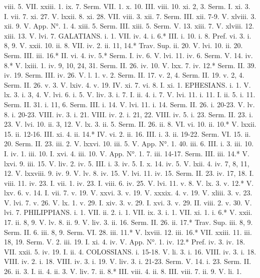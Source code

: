 viii. 5.	VII. xxiii. 1.
ix. 7.	Serm. VII. 1.
x. 10.	III. viii. 10.
xi. 2, 3.	Serm. I.
xi. 3.	I. vii. 7.
xi. 27.	V. lxxii. 8.
xi. 28.	VII. viii. 3.
xii. 7.	Serm. III.
xii. 7-9.	V. xlviii. 3.
xii. 9.	V. App. N°. 1. 4.
xiii. 5.	Serm. III.
xiii. 5.	Serm. V. 13.
xiii. 7.	V. xlviii. 12.
xiii. 13.	V. lvi. 7.
GALATIANS.
i. 1.	VII. iv. 4.
i. 6.*	III. i. 10.
i. 8.	Pref. vi. 3.
i. 8, 9.	V. xxii. 10.
ii. 8.	VII. iv. 2.
ii. 11, 14.*	Trav. Sup.
ii. 20.	V. lvi. 10.
ii. 20.	Serm. III.
iii. 16.*	II. vi. 4.
iv. 5.*	Serm. I.
iv. 6.	V. lvi. 11.
iv. 6.	Serm. V. 14.
iv. 8.*	V. lxiii. 1.
iv. 9, 10, 24, 31.	Serm. II. 26.
iv. 10.	V. lxx. 7.
iv. 12.*	Serm. II. 39.
iv. 19.	Serm. III.
iv. 26.	V. l. 1.
v. 2.	Serm. II. 17.
v. 2, 4.	Serm. II. 19.
v. 2, 4.	Serm. II. 26.
v. 3.	V. lxiv. 4.
v. 19.	IV. xi. 7.
vi. 8.	I. xi. 1.
EPHESIANS.
i. 1.	V. lx. 3.
i. 3, 4.	V. lvi. 6.
i. 5.	V. liv. 3.
i. 7.	I. ii. 4.
i. 7.	V. lvi. 11.
i. 11.	I. ii. 5.
i. 11.	Serm. II. 31.
i. 11, 6.	Serm. III.
i. 14.	V. lvi. 11.
i. 14.	Serm. II. 26.
i. 20-23.	V. lv. 8.
i. 20-23.	VIII. iv. 3.
i. 21.	VIII. iv. 2.
i. 21, 22.	VIII. iv. 5.
i. 23.	Serm. II. 23.
i. 23.	V. lvi. 10.
ii. 3, 12.	V. lx. 3.
ii. 5.	Serm. II. 26.
ii. 8.	VI. vi. 10.
ii. 10.*	V. lxxii. 15.
ii. 12-16.	III. xi. 4.
ii. 14.*	IV. vi. 2.
ii. 16.	III. i. 3.
ii. 19-22.	Serm. VI. 15.
ii. 20.	Serm. II. 23.
iii. 2.	V. lxxvi. 10.
iii. 5.	V. App. N°. 1. 40.
iii. 6.	III. i. 3.
iii. 10.	I. iv. 1.
iii. 10.	I. xvi. 4.
iii. 10.	V. App. N°. 1. 7.
iii. 14-17.	Serm. III.
iii. 14.*	V. lxvi. 9.
iii. 15.	V. liv. 2.
iv. 5.	III. i. 3.
iv. 5.	I. x. 14.
iv. 5.	V. lxii. 4.
iv. 7, 8, 11, 12.	V. lxxviii. 9.
iv. 9.	V. lv. 8.
iv. 15.	V. lvi. 11.
iv. 15.	Serm. II. 23.
iv. 17, 18.	I. viii. 11.
iv. 23.	I. vii. 1.
iv. 23.	I. viii. 6.
iv. 25.	V. lvi. 11.
v. 8.	V. lx. 3.
v. 12.*	V. lxv. 6.
v. 14.	I. vii. 7.
v. 19.	V. xxvi. 3.
v. 19.	V. xxxix. 4.
v. 19.	V. xliii. 3.
v. 23.	V. lvi. 7.
v. 26.	V. lx. 1.
v. 29.	I. xiv. 3.
v. 29.	I. xvi. 3.
v. 29.	II. viii. 2.
v. 30.	V. lvi. 7.
PHILIPPIANS.
i. 1.	VII. ii. 2.
i. 1.	VII. ix. 3.
i. 1.	VII. xi. 1.
i. 6.*	V. xxii. 17.
ii. 8, 9.	V. lv. 8.
ii. 9.	V. liv. 3.
ii. 16.	Serm. II. 26.
ii. 17.*	Trav. Sup.
iii. 8, 9.	Serm. II. 6.
iii. 8, 9.	Serm. VI. 28.
iii. 11.*	V. lxviii. 12.
iii. 16.*	VII. xxiii. 11.
iii. 18, 19.	Serm. V. 2.
iii. 19.	I. xi. 4.
iv.	V. App. N°. 1.
iv. 12.*	Pref. iv. 3.
iv. 18.	VII. xxii. 5.
iv. 19.	I. ii. 4.
COLOSSIANS.
i. 15-18.	V. li. 3.
i. 16.	VIII. iv. 3.
i. 18.	VIII. iv. 2.
i. 18.	VIII. iv. 3.
i. 19.	V. liv. 3.
i. 21-23.	Serm. V. 14.
i. 23.	Serm. II. 26.
ii. 3.	I. ii. 4.
ii. 3.	V. liv. 7.
ii. 8.*	III. viii. 4.
ii. 8.	III. viii. 7.
ii. 9.	V. li. 1.
